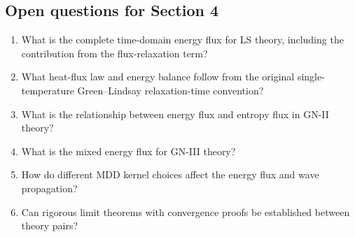 \subsection{Open questions for Section 4}

\begin{enumerate}[label=\textbf{OQ4.\arabic*}]
\item What is the complete time-domain energy flux for LS theory, including the contribution from the flux-relaxation term? \\ \label{oq:4.1}
\item What heat-flux law and energy balance follow from the original single-temperature Green--Lindsay relaxation-time convention? \\ \label{oq:4.2}
\item What is the relationship between energy flux and entropy flux in GN-II theory? \\ \label{oq:4.3}
\item What is the mixed energy flux for GN-III theory? \\ \label{oq:4.4}
\item How do different MDD kernel choices affect the energy flux and wave propagation? \\ \label{oq:4.5}
\item Can rigorous limit theorems with convergence proofs be established between theory pairs? \\ \label{oq:4.6}
\end{enumerate}

